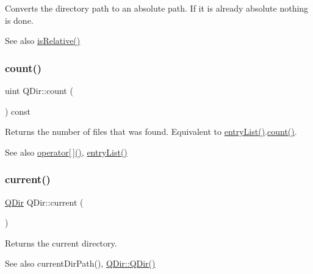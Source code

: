 Converts the directory path to an absolute path. If it is already absolute nothing is done.

\begin{DoxySeeAlso}{See also}
\mbox{\hyperlink{class_q_dir_a2b420c4c2e7b5764ab1fb35e37d1726f}{is\+Relative()}} 
\end{DoxySeeAlso}
\mbox{\label{class_q_dir_a66e09c7fe6ec493febc170bdafbe71ab}} 
\subsubsection{\texorpdfstring{count()}{count()}}
{\footnotesize\ttfamily uint Q\+Dir\+::count (\begin{DoxyParamCaption}{ }\end{DoxyParamCaption}) const}

Returns the number of files that was found. Equivalent to \mbox{\hyperlink{class_q_dir_ab5e2b4ce772dc4b8941425cf780df9ab}{entry\+List()}}.\mbox{\hyperlink{class_q_dir_a66e09c7fe6ec493febc170bdafbe71ab}{count()}}. \begin{DoxySeeAlso}{See also}
\mbox{\hyperlink{class_q_dir_a1f76a6cf2cdc4e7d7c1421aac8b77b7f}{operator\mbox{[}$\,$\mbox{]}()}}, \mbox{\hyperlink{class_q_dir_ab5e2b4ce772dc4b8941425cf780df9ab}{entry\+List()}} 
\end{DoxySeeAlso}
\mbox{\label{class_q_dir_a697f013a5d4ae0c805546a2dd8f55707}} 
\subsubsection{\texorpdfstring{current()}{current()}}
{\footnotesize\ttfamily \mbox{\hyperlink{class_q_dir}{Q\+Dir}} Q\+Dir\+::current (\begin{DoxyParamCaption}{ }\end{DoxyParamCaption})\hspace{0.3cm}{\ttfamily [static]}}

Returns the current directory. \begin{DoxySeeAlso}{See also}
current\+Dir\+Path(), \mbox{\hyperlink{class_q_dir_a78cf34af6b7e0ffa3d11ef0ba0ecd403}{Q\+Dir\+::\+Q\+Dir()}} 
\end{DoxySeeAlso}
\mbox{\label{class_q_dir_a2c904d64a7194a57ee583d111cbbdeff}} 
